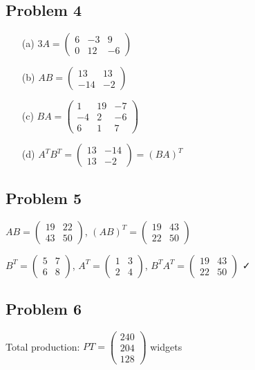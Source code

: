 \documentclass[11pt]{article}
\begin{document}
\subsection*{Problem 4}
\begin{enumerate}
\item[(a)] $3A = \begin{pmatrix} 6 & -3 & 9 \\ 0 & 12 & -6 \end{pmatrix}$
\item[(b)] $AB = \begin{pmatrix} 13 & 13 \\ -14 & -2 \end{pmatrix}$
\item[(c)] $BA = \begin{pmatrix} 1 & 19 & -7 \\ -4 & 2 & -6 \\ 6 & 1 & 7 \end{pmatrix}$
\item[(d)] $A^T B^T = \begin{pmatrix} 13 & -14 \\ 13 & -2 \end{pmatrix} = (BA)^T$
\end{enumerate}

\subsection*{Problem 5}
$AB = \begin{pmatrix} 19 & 22 \\ 43 & 50 \end{pmatrix}$, $(AB)^T = \begin{pmatrix} 19 & 43 \\ 22 & 50 \end{pmatrix}$

$B^T = \begin{pmatrix} 5 & 7 \\ 6 & 8 \end{pmatrix}$, $A^T = \begin{pmatrix} 1 & 3 \\ 2 & 4 \end{pmatrix}$, $B^T A^T = \begin{pmatrix} 19 & 43 \\ 22 & 50 \end{pmatrix}$ ✓

\subsection*{Problem 6}
Total production: $PT = \begin{pmatrix} 240 \\ 204 \\ 128 \end{pmatrix}$ widgets
\end{document}
